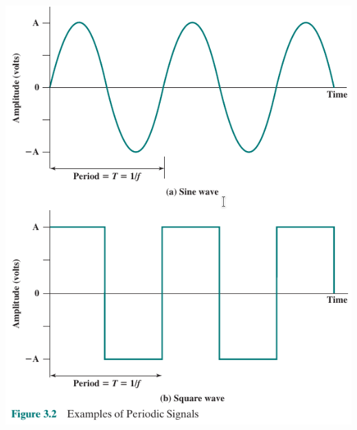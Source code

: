 \documentclass[pdflatex,compress]{beamer}
\begin{document}
\begin{frame}
	\begin{center}
		\includegraphics[height=0.9\textheight]{img/img02}
	\end{center}
\end{frame}
\end{document}
